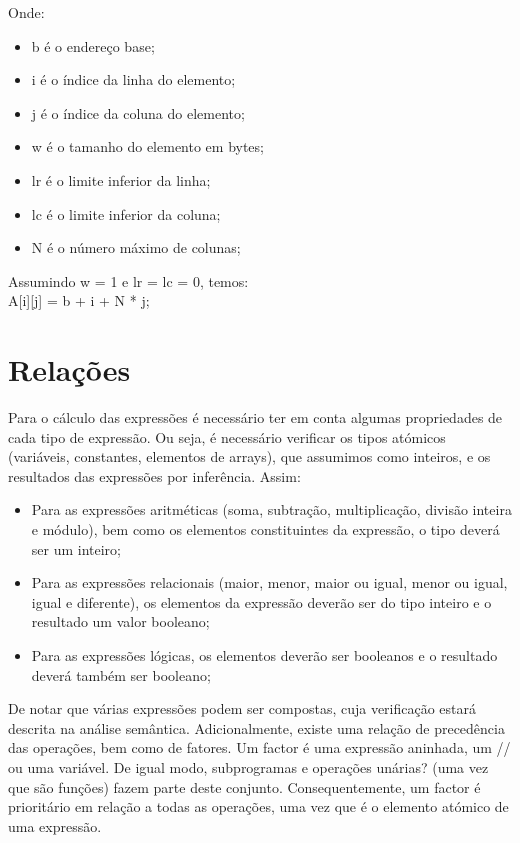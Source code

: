 Onde:

\begin{itemize}
\item b é o endereço base;
\item i é o índice da linha do elemento;
\item j é o índice da coluna do elemento;
\item w é o tamanho do elemento em bytes;
\item lr é o limite inferior da linha;
\item lc é o limite inferior da coluna;
\item N é o número máximo de colunas;
\end{itemize}

Assumindo w = 1 e lr = lc = 0, temos:\\

A[i][j] = b + i + N * j;\\


\section{Relações}
\label{sec:relacoes:analise}

Para o cálculo das expressões é necessário ter em conta algumas propriedades de cada tipo de expressão. Ou seja, é necessário verificar os tipos atómicos (variáveis, constantes, elementos de arrays), que assumimos como inteiros, e os resultados das expressões por inferência. Assim:\\
\begin{itemize}
\item Para as expressões aritméticas (soma, subtração, multiplicação, divisão inteira e módulo), bem como os elementos constituintes da expressão, o tipo deverá ser um inteiro;
\item Para as expressões relacionais (maior, menor, maior ou igual, menor ou igual, igual e diferente), os elementos da expressão deverão ser do tipo inteiro e o resultado um valor booleano;
\item Para as expressões lógicas, os elementos deverão ser booleanos e o resultado deverá também ser booleano;
\end{itemize}

De notar que várias expressões podem ser compostas, cuja verificação estará descrita na análise semântica. Adicionalmente, existe uma relação de precedência das operações, bem como de fatores. Um factor é uma expressão aninhada, um // ou uma variável. De igual modo, subprogramas e operações unárias? (uma vez que são funções) fazem parte deste conjunto. Consequentemente, um factor é prioritário em relação a todas as operações, uma vez que é o elemento atómico de uma expressão.\\

